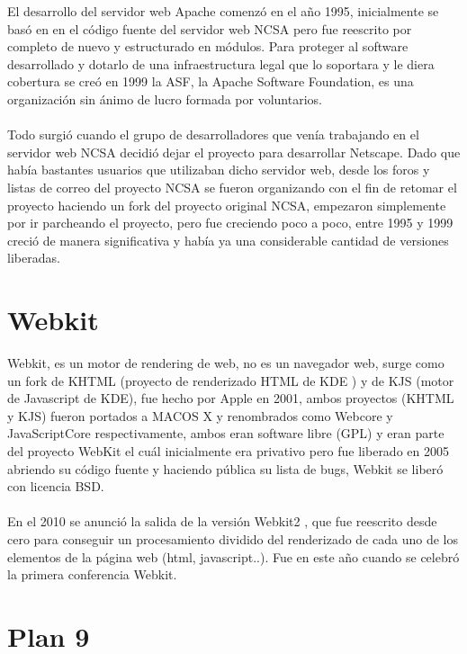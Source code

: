 \documentclass[a4paper,oneside,11pt]{article}
\begin{document}
El desarrollo del servidor web Apache comenz\'o en el año 1995, inicialmente se bas\'o en en el c\'odigo fuente del servidor web NCSA
pero fue reescrito por completo de nuevo y estructurado en m\'odulos. Para proteger al software desarrollado y dotarlo de una
infraestructura legal que lo soportara y le diera cobertura se cre\'o en 1999 la ASF, la Apache Software Foundation, es una
organizaci\'on sin \'animo de lucro formada por voluntarios.\\
\\
Todo surgi\'o cuando el grupo de desarrolladores que ven\'ia trabajando en el servidor web NCSA decidi\'o dejar el proyecto para desarrollar Netscape.
Dado que hab\'ia bastantes usuarios que utilizaban dicho servidor web, desde los foros y listas de correo del proyecto NCSA se fueron organizando con 
el fin de retomar el proyecto haciendo un fork del proyecto original NCSA, empezaron simplemente por ir parcheando el proyecto, pero
fue creciendo poco a poco, entre 1995 y 1999 creci\'o de manera significativa y hab\'ia ya una considerable cantidad de versiones liberadas. 

\section{Webkit}

Webkit, es un motor de rendering de web, no es un navegador web, surge como un fork de KHTML (proyecto de renderizado HTML de KDE )
 y de KJS (motor de Javascript de KDE), fue hecho por Apple en 2001, ambos proyectos (KHTML y KJS) fueron portados a MACOS X  y renombrados como Webcore y 
JavaScriptCore respectivamente, ambos eran software libre (GPL) y eran parte del proyecto WebKit el cu\'al inicialmente era privativo pero fue 
liberado en 2005 abriendo su c\'odigo fuente y haciendo p\'ublica su lista de bugs, Webkit se liber\'o con licencia BSD.\\
\\
En el 2010 se anunci\'o la salida de la versi\'on Webkit2 , que fue reescrito desde cero para conseguir un procesamiento dividido
del renderizado de cada uno de los elementos de la p\'agina web (html, javascript..). Fue en este año cuando se celebr\'o la primera 
conferencia Webkit.

\section{Plan 9}
\end{document}
